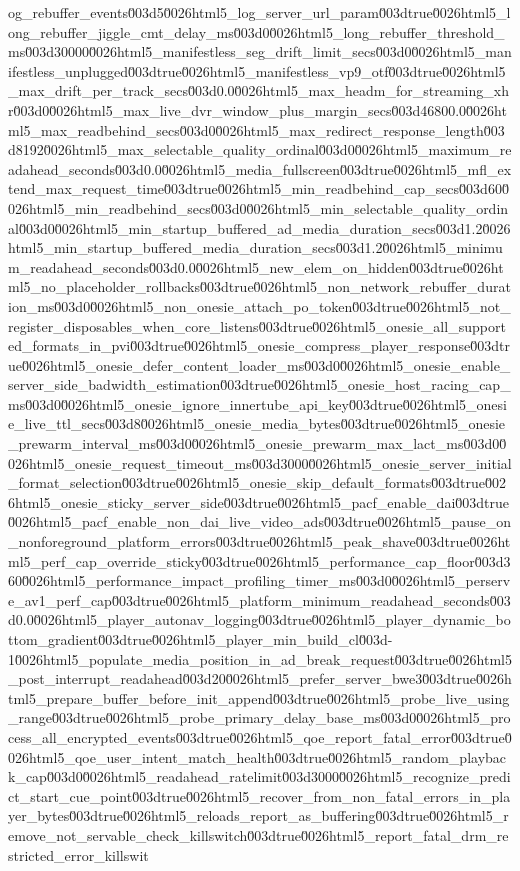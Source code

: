 {og_rebuffer_events\u003d5\u0026html5_log_server_url_param\u003dtrue\u0026html5_long_rebuffer_jiggle_cmt_delay_ms\u003d0\u0026html5_long_rebuffer_threshold_ms\u003d30000\u0026html5_manifestless_seg_drift_limit_secs\u003d0\u0026html5_manifestless_unplugged\u003dtrue\u0026html5_manifestless_vp9_otf\u003dtrue\u0026html5_max_drift_per_track_secs\u003d0.0\u0026html5_max_headm_for_streaming_xhr\u003d0\u0026html5_max_live_dvr_window_plus_margin_secs\u003d46800.0\u0026html5_max_readbehind_secs\u003d0\u0026html5_max_redirect_response_length\u003d8192\u0026html5_max_selectable_quality_ordinal\u003d0\u0026html5_maximum_readahead_seconds\u003d0.0\u0026html5_media_fullscreen\u003dtrue\u0026html5_mfl_extend_max_request_time\u003dtrue\u0026html5_min_readbehind_cap_secs\u003d60\u0026html5_min_readbehind_secs\u003d0\u0026html5_min_selectable_quality_ordinal\u003d0\u0026html5_min_startup_buffered_ad_media_duration_secs\u003d1.2\u0026html5_min_startup_buffered_media_duration_secs\u003d1.2\u0026html5_minimum_readahead_seconds\u003d0.0\u0026html5_new_elem_on_hidden\u003dtrue\u0026html5_no_placeholder_rollbacks\u003dtrue\u0026html5_non_network_rebuffer_duration_ms\u003d0\u0026html5_non_onesie_attach_po_token\u003dtrue\u0026html5_not_register_disposables_when_core_listens\u003dtrue\u0026html5_onesie_all_supported_formats_in_pvi\u003dtrue\u0026html5_onesie_compress_player_response\u003dtrue\u0026html5_onesie_defer_content_loader_ms\u003d0\u0026html5_onesie_enable_server_side_badwidth_estimation\u003dtrue\u0026html5_onesie_host_racing_cap_ms\u003d0\u0026html5_onesie_ignore_innertube_api_key\u003dtrue\u0026html5_onesie_live_ttl_secs\u003d8\u0026html5_onesie_media_bytes\u003dtrue\u0026html5_onesie_prewarm_interval_ms\u003d0\u0026html5_onesie_prewarm_max_lact_ms\u003d0\u0026html5_onesie_request_timeout_ms\u003d3000\u0026html5_onesie_server_initial_format_selection\u003dtrue\u0026html5_onesie_skip_default_formats\u003dtrue\u0026html5_onesie_sticky_server_side\u003dtrue\u0026html5_pacf_enable_dai\u003dtrue\u0026html5_pacf_enable_non_dai_live_video_ads\u003dtrue\u0026html5_pause_on_nonforeground_platform_errors\u003dtrue\u0026html5_peak_shave\u003dtrue\u0026html5_perf_cap_override_sticky\u003dtrue\u0026html5_performance_cap_floor\u003d360\u0026html5_performance_impact_profiling_timer_ms\u003d0\u0026html5_perserve_av1_perf_cap\u003dtrue\u0026html5_platform_minimum_readahead_seconds\u003d0.0\u0026html5_player_autonav_logging\u003dtrue\u0026html5_player_dynamic_bottom_gradient\u003dtrue\u0026html5_player_min_build_cl\u003d-1\u0026html5_populate_media_position_in_ad_break_request\u003dtrue\u0026html5_post_interrupt_readahead\u003d20\u0026html5_prefer_server_bwe3\u003dtrue\u0026html5_prepare_buffer_before_init_append\u003dtrue\u0026html5_probe_live_using_range\u003dtrue\u0026html5_probe_primary_delay_base_ms\u003d0\u0026html5_process_all_encrypted_events\u003dtrue\u0026html5_qoe_report_fatal_error\u003dtrue\u0026html5_qoe_user_intent_match_health\u003dtrue\u0026html5_random_playback_cap\u003d0\u0026html5_readahead_ratelimit\u003d3000\u0026html5_recognize_predict_start_cue_point\u003dtrue\u0026html5_recover_from_non_fatal_errors_in_player_bytes\u003dtrue\u0026html5_reloads_report_as_buffering\u003dtrue\u0026html5_remove_not_servable_check_killswitch\u003dtrue\u0026html5_report_fatal_drm_restricted_error_killswit}
